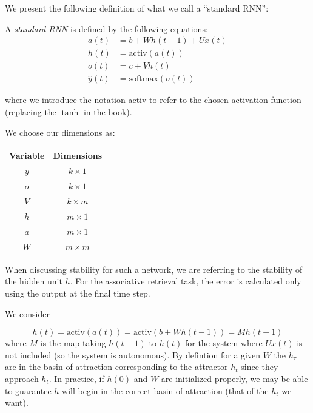 We present the following definition \cite[p. 381]{Goodfellow-et-al-2016} of what we call a ``standard RNN'':

\begin{definition}
  A \emph{standard RNN} is defined by the following equations:
\begin{align*}
  a(t) & = b + W h(t-1) + U x(t) \\
  h(t) & = \mbox{activ}(a(t)) \\
  o(t) & = c + V h(t) \\
  \widehat{y}(t) & = \mbox{softmax}(o(t))
\end{align*}
\end{definition}

\noindent where we introduce the notation \mbox{activ} to refer to the chosen activation function (replacing the $\tanh$ in the book).

We choose our dimensions as:

\begin{center}
\begin{tabular}{c c}
  Variable & Dimensions \\
  \hline
  $y$ & $k \times 1$ \\
  $o$ & $k \times 1$ \\
  $V$ & $k \times m$ \\
  $h$ & $m \times 1$ \\
  $a$ & $m \times 1$ \\
  $W$ & $m \times m$
\end{tabular}
\end{center}

When discussing stability for such a network, we are referring to the stability of the hidden unit $h$. For the associative retrieval task, the error is calculated only using the output at the final time step.

We consider

\begin{equation*}
h(t) = \mbox{activ}(a(t)) = \mbox{activ}(b + W h(t-1)) = M h(t-1)
\end{equation*}
%
where $M$ is the map taking $h(t - 1)$ to $h(t)$ for the system where $Ux(t)$ is not included (so the system is autonomous). By defintion for a given $W$ the $h_\tau$ are in the basin of attraction corresponding to the attractor $h_t$ since they approach $h_t$. In practice, if $h(0)$ and $W$ are initialized properly, we may be able to guarantee $h$ will begin in the correct basin of attraction (that of the $h_t$ we want).

